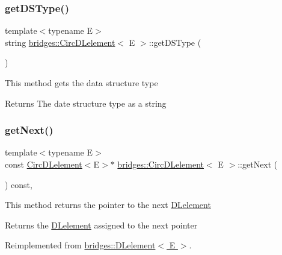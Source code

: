 \subsubsection{\texorpdfstring{get\+D\+S\+Type()}{getDSType()}}
{\footnotesize\ttfamily template$<$typename E$>$ \\
string \hyperlink{classbridges_1_1_circ_d_lelement}{bridges\+::\+Circ\+D\+Lelement}$<$ E $>$\+::get\+D\+S\+Type (\begin{DoxyParamCaption}{ }\end{DoxyParamCaption})\hspace{0.3cm}{\ttfamily [inline]}}

This method gets the data structure type

\begin{DoxyReturn}{Returns}
The date structure type as a string 
\end{DoxyReturn}
\hypertarget{classbridges_1_1_circ_d_lelement_ad02db972b2a525de01855bfed1a45ea4}{}\label{classbridges_1_1_circ_d_lelement_ad02db972b2a525de01855bfed1a45ea4} 
\subsubsection{\texorpdfstring{get\+Next()}{getNext()}}
{\footnotesize\ttfamily template$<$typename E$>$ \\
const \hyperlink{classbridges_1_1_circ_d_lelement}{Circ\+D\+Lelement}$<$E$>$$\ast$ \hyperlink{classbridges_1_1_circ_d_lelement}{bridges\+::\+Circ\+D\+Lelement}$<$ E $>$\+::get\+Next (\begin{DoxyParamCaption}{ }\end{DoxyParamCaption}) const\hspace{0.3cm}{\ttfamily [inline]}, {\ttfamily [virtual]}}

This method returns the pointer to the next \hyperlink{classbridges_1_1_d_lelement}{D\+Lelement} \begin{DoxyReturn}{Returns}
the \hyperlink{classbridges_1_1_d_lelement}{D\+Lelement} assigned to the next pointer 
\end{DoxyReturn}


Reimplemented from \hyperlink{classbridges_1_1_d_lelement_a648012849263b4b1cd2d504d5e5fd880}{bridges\+::\+D\+Lelement$<$ E $>$}.

\hypertarget{classbridges_1_1_circ_d_lelement_a8a1aa2f979094bccf2cca2ca31f0373d}{}\label{classbridges_1_1_circ_d_lelement_a8a1aa2f979094bccf2cca2ca31f0373d} 
